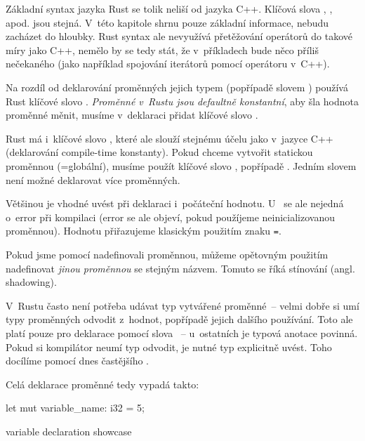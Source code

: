 \documentclass[main.tex]{subfiles}
\begin{document}

Základní syntax jazyka Rust se tolik neliší od jazyka C++. Klíčová slova ,
,  apod. jsou stejná. V~této kapitole shrnu pouze základní
informace, nebudu zacházet do hloubky. Rust syntax ale nevyužívá přetěžování operátorů
do takové míry jako C++, nemělo by se tedy stát, že v~příkladech bude něco příliš
nečekaného (jako například spojování iterátorů pomocí operátoru \icpp{|} v~C++).


Na rozdíl od deklarování proměnných jejich typem (popřípadě slovem ) používá
Rust klíčové slovo . \emph{Proměnné v~Rustu jsou defaultně konstantní}, aby
šla hodnota proměnné měnit, musíme v~deklaraci přidat klíčové slovo .

Rust má i~klíčové slovo , které ale slouží stejnému účelu jako
 v~jazyce C++ (deklarování compile-time konstanty).
Pokud chceme vytvořit statickou proměnnou (=globální), musíme použít klíčové slovo
, popřípadě . Jedním slovem není možné deklarovat více
proměnných.

Většinou je vhodné uvést při deklaraci i~počáteční hodnotu. U~ se ale
nejedná o~error při kompilaci (error se ale objeví, pokud použíjeme neinicializovanou
proměnnou). Hodnotu přiřazujeme klasickým použitím znaku \texttt{=}.

Pokud jsme pomocí  nadefinovali proměnnou, můžeme opětovným použitím
 nadefinovat \emph{jinou proměnnou} se stejným názvem. Tomuto se říká stínování
(angl. shadowing). \cite[sekce\,3.1]{thebook}

V~Rustu často není potřeba udávat typ vytvářené proměnné~-- velmi dobře si umí typy
proměnných odvodit z~hodnot, popřípadě jejich dalšího používání. Toto ale platí pouze
pro deklarace pomocí slova ~-- u~ostatních je typová anotace povinná. Pokud
si kompilátor neumí typ odvodit, je nutné typ explicitně uvést. Toho docílíme pomocí
dnes častějšího . \cite[sekce\,3.2]{thebook}

Celá deklarace proměnné tedy vypadá takto:

\obrazek
\begin{rustcode}
    let mut variable_name: i32 = 5;
\end{rustcode}
{variable declaration showcase}
\end{document}
